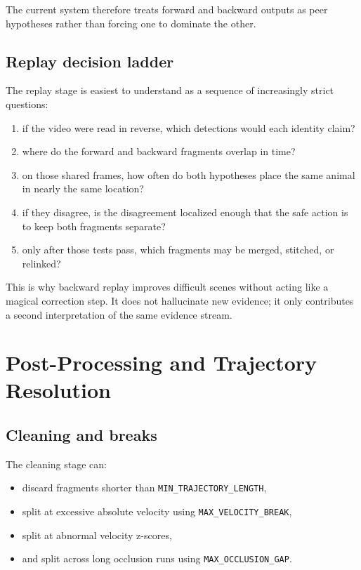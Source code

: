\documentclass[11pt]{article}
\newcommand{\runtimekey}[1]{\texttt{#1}}
\begin{document}
The current system therefore treats forward and backward outputs as peer hypotheses rather than forcing one to dominate the other.

\subsection{Replay decision ladder}

The replay stage is easiest to understand as a sequence of increasingly strict questions:

\begin{enumerate}
  \item if the video were read in reverse, which detections would each identity claim?
  \item where do the forward and backward fragments overlap in time?
  \item on those shared frames, how often do both hypotheses place the same animal in nearly the same location?
  \item if they disagree, is the disagreement localized enough that the safe action is to keep both fragments separate?
  \item only after those tests pass, which fragments may be merged, stitched, or relinked?
\end{enumerate}

This is why backward replay improves difficult scenes without acting like a magical correction step. It does not hallucinate new evidence; it only contributes a second interpretation of the same evidence stream.

\section{Post-Processing and Trajectory Resolution}

\begin{center}
  \resizebox{\linewidth}{!}{}
  \label{fig:post}
\end{center}

\subsection{Cleaning and breaks}

The cleaning stage can:

\begin{itemize}
  \item discard fragments shorter than \runtimekey{MIN\_TRAJECTORY\_LENGTH},
  \item split at excessive absolute velocity using \runtimekey{MAX\_VELOCITY\_BREAK},
  \item split at abnormal velocity z-scores,
  \item and split across long occlusion runs using \runtimekey{MAX\_OCCLUSION\_GAP}.
\end{itemize}
\end{document}

